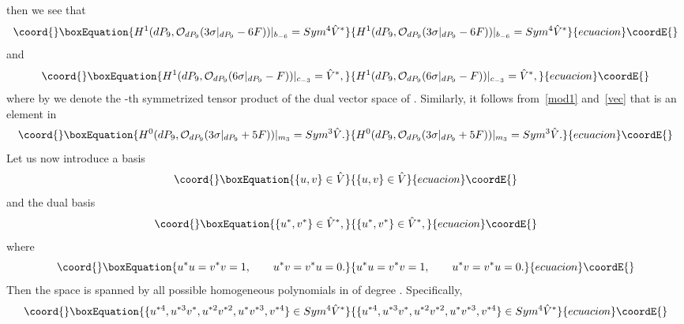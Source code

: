 \documentclass[a4paper,12pt]{article}
\numberwithin{equation}{section}
\theoremstyle{plain}
\begin{document}
%
then we see that
%
\begin{equation}\coord{}\boxEquation{
H^{1} (dP_9, {\cal O}_{dP_9} (3 \sigma|_{dP_9} -6F))|_{b_{-6}}=
Sym^{4}\hat{V}^{*}
\label{69}
}{
H^{1} (dP_9, {\cal O}_{dP_9} (3 \sigma|_{dP_9} -6F))|_{b_{-6}}=
Sym^{4}\hat{V}^{*}
}{ecuacion}\coordE{}\end{equation}
%
and
%
\begin{equation}\coord{}\boxEquation{
H^{1} (dP_9, {\cal O}_{dP_9} (6 \sigma|_{dP_9} -F))|_{c_{-3}}=
\hat{V}^{*},
\label{70}
}{
H^{1} (dP_9, {\cal O}_{dP_9} (6 \sigma|_{dP_9} -F))|_{c_{-3}}=
\hat{V}^{*},
}{ecuacion}\coordE{}\end{equation}
%
where by \coordHE{} we denote the \coordHE{}-th symmetrized tensor
product
of the dual vector space \coordHE{} of \coordHE{}.
Similarly, it follows from~\eqref{mod1} and~\eqref{vec} that \coordHE{}
is an element in
%
\begin{equation}\coord{}\boxEquation{
H^{0}(dP_9, {\cal O}_{dP_9} (3 \sigma|_{dP_9} +5F))|_{m_3} =
Sym^{3}\hat{V}.
\label{71}
}{
H^{0}(dP_9, {\cal O}_{dP_9} (3 \sigma|_{dP_9} +5F))|_{m_3} =
Sym^{3}\hat{V}.
}{ecuacion}\coordE{}\end{equation}
%
Let us now introduce a basis
%
\begin{equation}\coord{}\boxEquation{
\{u, v\} \in \hat{V}
\label{72}
}{
\{u, v\} \in \hat{V}
}{ecuacion}\coordE{}\end{equation}
%
and the dual basis
%
\begin{equation}\coord{}\boxEquation{
\{u^{*}, v^{*}\} \in \hat{V}^{*},
\label{73}
}{
\{u^{*}, v^{*}\} \in \hat{V}^{*},
}{ecuacion}\coordE{}\end{equation}
%
where
%
\begin{equation}\coord{}\boxEquation{
u^{*} u =v^{*} v =1, \qquad u^{*}v =v^{*} u =0.
\label{74}
}{
u^{*} u =v^{*} v =1, \qquad u^{*}v =v^{*} u =0.
}{ecuacion}\coordE{}\end{equation}
%
Then the space \coordHE{} is spanned by all possible homogeneous
polynomials in \coordHE{} of degree \coordHE{}. Specifically,
%
\begin{equation}\coord{}\boxEquation{
\{u^{*4}, u^{*3}v^{*}, u^{*2}v^{*2}, u^{*}v^{*3}, v^{*4} \}\in
Sym^{4}\hat{V}^{*}
\label{75}
}{
\{u^{*4}, u^{*3}v^{*}, u^{*2}v^{*2}, u^{*}v^{*3}, v^{*4} \}\in
Sym^{4}\hat{V}^{*}
}{ecuacion}\coordE{}\end{equation}
\end{document}
